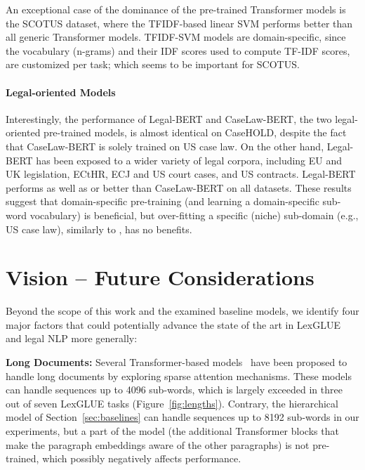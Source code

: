 \documentclass[11pt]{article}
\begin{document}
An exceptional case of the dominance of the pre-trained Transformer models is the SCOTUS dataset, where the TFIDF-based linear SVM performs better than all generic Transformer models. TFIDF-SVM models are domain-specific, since the vocabulary (n-grams) and their IDF scores used to compute TF-IDF scores, are customized per task; which seems to be important for SCOTUS.



\paragraph{Legal-oriented Models}
Interestingly, the performance of Legal-BERT and  CaseLaw-BERT, the two legal-oriented pre-trained models, is almost identical on CaseHOLD, despite the fact that CaseLaw-BERT is solely trained on US case law. On the other hand, Legal-BERT has been exposed to a wider variety of legal corpora, including EU and UK legislation, ECtHR, ECJ and US court cases, and US contracts. Legal-BERT performs as well as or better than CaseLaw-BERT on all datasets. These results suggest that domain-specific pre-training (and learning a domain-specific sub-word vocabulary) is beneficial, but over-fitting a specific (niche) sub-domain (e.g., US case law), similarly to \citet{zhengguha2021}, has no benefits.

\section{Vision -- Future Considerations}
\label{sec:vision}
Beyond the scope of this work and the examined baseline models, we identify four major factors that could potentially advance the state of the art in LexGLUE and legal NLP more generally:\vspace{2mm}

\noindent\textbf{Long Documents:} Several Transformer-based  models~\cite{Longformer, BigBird, liu2022erniesparse} have been proposed to handle long documents by exploring sparse attention mechanisms. These models can handle sequences up to 4096 sub-words, which is largely exceeded in three out of seven LexGLUE tasks (Figure~\ref{fig:lengths}). Contrary, the hierarchical model of Section~\ref{sec:baselines} can handle sequences up to 8192 sub-words in our experiments, but a part of the model (the additional Transformer blocks that make the paragraph embeddings aware of the other paragraphs) is not pre-trained, which possibly negatively affects performance.\vspace{2mm} 
\end{document}
